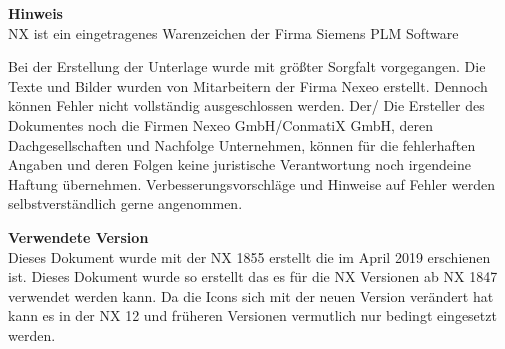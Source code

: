 \textbf{Hinweis}\\
NX \textsuperscript{\texttrademark} ist ein eingetragenes Warenzeichen der Firma Siemens PLM Software

Bei der Erstellung der Unterlage wurde mit größter Sorgfalt vorgegangen. Die Texte und Bilder wurden von Mitarbeitern der Firma Nexeo erstellt. Dennoch können Fehler nicht vollständig ausgeschlossen werden. Der/ Die Ersteller des Dokumentes noch die Firmen Nexeo GmbH/ConmatiX GmbH, deren Dachgesellschaften und Nachfolge Unternehmen, können für die fehlerhaften Angaben und deren Folgen keine juristische Verantwortung noch irgendeine Haftung übernehmen. Verbesserungsvorschläge und Hinweise auf Fehler werden selbstverständlich gerne angenommen.

\textbf{Verwendete Version}\\
Dieses Dokument wurde mit der NX \textsuperscript{\texttrademark} 1855 erstellt die im April 2019 erschienen ist. Dieses Dokument wurde so erstellt das es für die NX Versionen ab NX\textsuperscript{\texttrademark} 1847 verwendet werden kann. Da die Icons sich mit der neuen Version verändert hat kann es in der NX\textsuperscript{\texttrademark} 12 und früheren Versionen vermutlich nur bedingt eingesetzt werden. 

